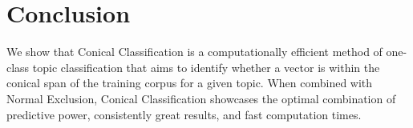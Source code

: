 \documentclass[11pt]{article}
\begin{document}
\section{Conclusion}
We show that Conical Classification is a computationally efficient method of one-class topic classification that aims to identify whether a vector is within the conical span of the training corpus for a given topic. When combined with Normal Exclusion, Conical Classification showcases the optimal combination of predictive power, consistently great results, and fast computation times. 

\nocite{scikit-learn}


\end{document}
